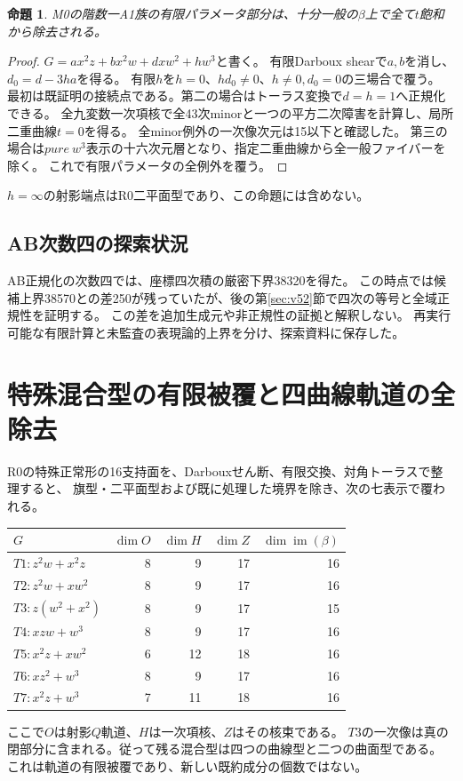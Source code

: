 \documentclass[11pt,a4paper]{ltjsarticle}
\newtheorem{proposition}[theorem]{命題}
\theoremstyle{remark}
\begin{document}
\begin{proposition}
M0の階数一A1族の有限パラメータ部分は、十分一般の$\beta$上で全て$t$飽和から除去される。
\end{proposition}
\begin{proof}
$G=ax^2z+bx^2w+dxw^2+hw^3$と書く。
有限Darboux shearで$a,b$を消し、$d_0=d-3ha$を得る。
有限$h$を$h=0$、$hd_0\ne0$、$h\ne0,d_0=0$の三場合で覆う。
最初は既証明の接続点である。第二の場合はトーラス変換で$d=h=1$へ正規化できる。
全九変数一次項核で全43次minorと一つの平方二次障害を計算し、局所二重曲線$t=0$を得る。
全minor例外の一次像次元は15以下と確認した。
第三の場合は$pure\ w^3$表示の十六次元層となり、指定二重曲線から全一般ファイバーを除く。
これで有限パラメータの全例外を覆う\cite{minimal-a1-v38}。
\end{proof}
$h=\infty$の射影端点はR0二平面型であり、この命題には含めない。

\subsection*{AB次数四の探索状況}
AB正規化の次数四では、座標四次積の厳密下界38320を得た。
この時点では候補上界38570との差250が残っていたが、後の第\ref{sec:v52}節で四次の等号と全域正規性を証明する。
この差を追加生成元や非正規性の証拠と解釈しない。
再実行可能な有限計算と未監査の表現論的上界を分け、探索資料に保存した。


\section{特殊混合型の有限被覆と四曲線軌道の全除去}
R0の特殊正常形の16支持面を、Darbouxせん断、有限交換、対角トーラスで整理すると、
旗型・二平面型および既に処理した境界を除き、次の七表示で覆われる。
\begin{center}
\begin{tabular}{lrrrr}
\toprule
$G$ & $\dim O$ & $\dim H$ & $\dim Z$ & $\dim\operatorname{im}(\beta)$\\
\midrule
$T1:z^2w+x^2z$ &8&9&17&16\\
$T2:z^2w+xw^2$ &8&9&17&16\\
$T3:z(w^2+x^2)$ &8&9&17&15\\
$T4:xzw+w^3$ &8&9&17&16\\
$T5:x^2z+xw^2$ &6&12&18&16\\
$T6:xz^2+w^3$ &8&9&17&16\\
$T7:x^2z+w^3$ &7&11&18&16\\
\bottomrule
\end{tabular}
\end{center}
ここで$O$は射影$Q$軌道、$H$は一次項核、$Z$はその核束である。
$T3$の一次像は真の閉部分に含まれる。従って残る混合型は四つの曲線型と二つの曲面型である。
これは軌道の有限被覆であり、新しい既約成分の個数ではない\cite{mixed-cover-v39}。
\end{document}
